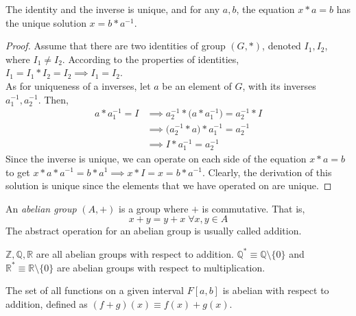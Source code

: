 \documentclass{article}
\begin{document}
    \begin{proposition}
      The identity and the inverse is unique, and for any $a, b$, the equation $x*a = b$ has the unique solution $x = b* a^{-1}$.
    \end{proposition}
    \begin{proof}
       Assume that there are two identities of group $(G,*)$, denoted $I_{1}, I_{2}$, where $I_{1} \neq I_{2}$. According to the properties of identities, $I_{1} = I_{1} * I_{2} = I_{2} \implies I_{1} = I_{2}$. \\
      As for uniqueness of a inverses, let $a$ be an element of $G$, with its inverses $a_{1}^{-1}, a_{2}^{-1}$. Then, 
      \begin{align*}
        a * a_{1}^{-1} = I & \implies a_{2}^{-1} * \Big(a * a_{1}^{-1} \Big)= a_{2}^{-1} * I \\
         & \implies \Big(a_{2}^{-1} * a \Big) * a_{1}^{-1} = a_{2}^{-1} \\
         & \implies I * a_{1}^{-1} = a_{2}^{-1}
      \end{align*}
      Since the inverse is unique, we can operate on each side of the equation $x*a = b$ to get $x*a*a^{-1} = b*a^{1} \implies x * I = x = b*a^{-1}$. Clearly, the derivation of this solution is unique since the elements that we have operated on are unique.
    \end{proof}

    \begin{definition}
      An \textit{abelian group} $(A, +)$ is a group where $+$ is commutative. That is, 
      \begin{equation}
        x+y = y+x \; \forall x, y \in A
      \end{equation}
      The abstract operation for an abelian group is usually called addition. 
    \end{definition}

    \begin{example}
      $\mathbb{Z}, \mathbb{Q}, \mathbb{R}$ are all abelian groups with respect to addition. $\mathbb{Q}^{*} \equiv \mathbb{Q} \setminus \{0\}$ and $\mathbb{R}^{*} \equiv \mathbb{R} \setminus \{0\}$ are abelian groups with respect to multiplication.
    \end{example}

    \begin{example}
      The set of all functions on a given interval $F[a,b]$ is abelian with respect to addition, defined as $(f+g)(x) \equiv f(x) + g(x)$. 
    \end{example}
\end{document}
